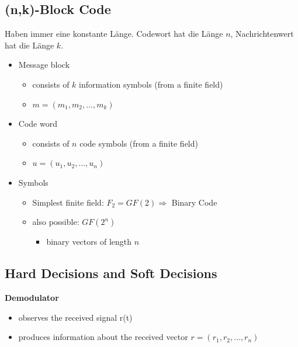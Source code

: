 \clearpage
\hypertarget{nk-block-code}{%
\subsection{(n,k)-Block Code}\label{nk-block-code}}

Haben immer eine konstante Länge. Codewort hat die Länge $n$,
Nachrichtenwert hat die Länge $k$.

\begin{itemize}
\tightlist
\item
  Message block

  \begin{itemize}
  \tightlist
  \item
    consists of $k$ information symbols (from a finite field)
  \item
    $m = (m_1 , m_2 , \ldots{}, m_k )$
  \end{itemize}
\item
  Code word

  \begin{itemize}
  \tightlist
  \item
    consists of $n$ code symbols (from a finite field)
  \item
    $u = (u_1 , u_2 , \ldots{}, u_n)$
  \end{itemize}
\item
  Symbols

  \begin{itemize}
  \tightlist
  \item
    Simplest finite field: $F_2 = GF(2) \Rightarrow$ Binary Code
  \item
    also possible: $GF(2^n)$

    \begin{itemize}
    \tightlist
    \item
      binary vectors of length $n$
    \end{itemize}
  \end{itemize}
\end{itemize}

\hypertarget{hard-decisions-and-soft-decisions}{%
\subsection{Hard Decisions and Soft
Decisions}\label{hard-decisions-and-soft-decisions}}

\textbf{Demodulator}
\begin{itemize}
    \item observes the received signal r(t)
    \item produces information about the received vector $r = (r_1 , r_2 , \ldots{}, r_n )$
\end{itemize}

